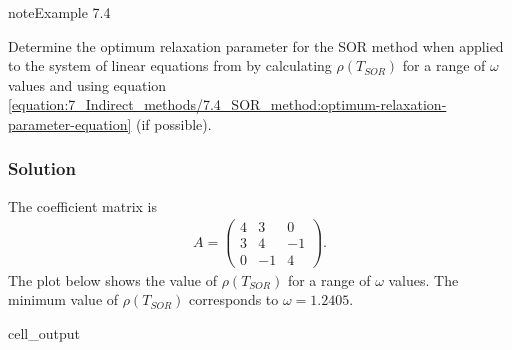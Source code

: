 \documentclass[letterpaper,10pt,english]{jupyterBook}
\begin{document}
\begin{sphinxadmonition}{note}{Example 7.4}

\sphinxAtStartPar
Determine the optimum relaxation parameter for the SOR method when applied to the system of linear equations from {\hyperref[\detokenize{7_Indirect_methods/7.1_Jacobi_method:jacobi-method-example}]{}} by calculating \(\rho(T_{SOR})\) for a range of \(\omega\) values and using equation \eqref{equation:7_Indirect_methods/7.4_SOR_method:optimum-relaxation-parameter-equation} (if possible).
\subsubsection*{Solution}

\sphinxAtStartPar
The coefficient matrix is
\begin{align*}
    A = \begin{pmatrix}
        4 & 3 & 0 \\ 
        3 & 4 & -1 \\
        0 & -1 & 4
    \end{pmatrix}.
\end{align*}
\sphinxAtStartPar
The plot below shows the value of \(\rho(T_{SOR})\) for a range of \(\omega\) values. The minimum value of \(\rho(T_{SOR})\) corresponds to \(\omega = 1.2405\).
\begin{sphinxVerbatimOutput}

\begin{sphinxuseclass}{cell_output}
\noindent{}

\end{sphinxuseclass}\end{sphinxVerbatimOutput}


\end{sphinxadmonition}
\end{document}
